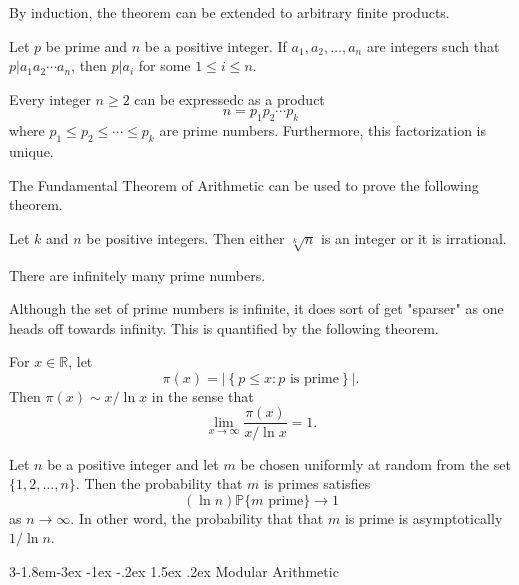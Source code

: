 \documentclass{tufte-handout}
\makeatletter
\renewcommand{\subsection}{\@startsection{subsection}%
    {3}{-1.8em}{-3ex \@plus -1ex \@minus -.2ex}%
    {1.5ex \@plus .2ex}
    {\hspace*{-5.5em}\fcolorbox{ltblue}{ltblue}{\parbox[c][1.0ex][b]{4em}{\phantom{space}}}
    \normalfont\large\itshape\color{ltblue}}}
\makeatother
\begin{document}
By induction, the theorem can be extended to arbitrary finite products.
\begin{Corollary}
    Let \( p \) be prime and \( n \) be a positive integer. If \( a_1, a_2, \ldots,a_n \) are
    integers such that \( p|a_1a_2\cdots a_n \), then \( p|a_i \) for some \( 1\leq i \leq n \).
\end{Corollary}

\begin{Theorem}
    Every integer \( n \geq 2 \) can be expressedc as a product
    \[ n = p_1p_2\cdots p_k \]
    where \( p_1\leq p_2\leq \cdots \leq p_k \) are prime numbers.
    Furthermore, this factorization is unique.
\end{Theorem}

The Fundamental Theorem of Arithmetic can be used to prove the following theorem.
\begin{Theorem}
    Let \( k \) and \( n \) be positive integers. Then either \( \sqrt[k]{n} \) is an integer or
    it is irrational.
\end{Theorem}

\begin{Theorem}
    There are infinitely many prime numbers.
\end{Theorem}

Although the set of prime numbers is infinite, it does sort of get "sparser" as one heads off towards infinity.
This is quantified by the following theorem.

\begin{Theorem}
    For \( x \in \mathbb{R} \), let 
    \[ \pi(x) = \left|\left\{ p \leq x : p \text{ is prime}\right\}\right|.\]
    Then \( \pi(x) \sim x \slash \ln x \) in the sense that
    \[ \lim_{x\to \infty} \frac{\pi(x)}{x/\ln x} = 1. \]
    
\end{Theorem}


\begin{Corollary}
    Let \( n \) be a positive integer and let \( m \) be chosen uniformly at random from the set \( \{1,2,\ldots,n\} \).
    Then the probability that \( m \) is primes satisfies
    \[(\ln n ) \mathbb{P}\{m\text{ prime}\} \to 1\]
    as \( n \to \infty \). In other word, the probability that that \( m \) is prime is 
    asymptotically \( 1/\ln n \).
\end{Corollary}

\subsection{Modular Arithmetic}
\end{document}
